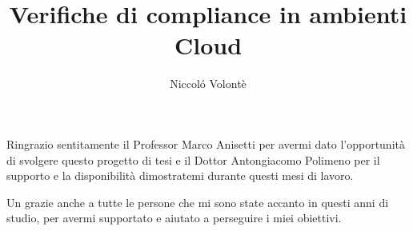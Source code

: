 \documentclass[twoside,12pt]{report}
\title{Verifiche di compliance in ambienti Cloud}
\author{Niccoló Volontè}
\begin{document}
    
    \makecenteredfrontpage
    
    
    	
    	
    	
    
    
    
    
    

    Ringrazio sentitamente il Professor Marco Anisetti per avermi dato l'opportunità di svolgere questo progetto di tesi e il Dottor Antongiacomo Polimeno per il supporto e la disponibilità dimostratemi durante questi mesi di lavoro.

    \vspace{1em}

    Un grazie anche a tutte le persone che mi sono state accanto in questi anni di studio, per avermi supportato e aiutato a perseguire i miei obiettivi.



    
    
    \afterpreface
    
    
    
    
    
\end{document}
